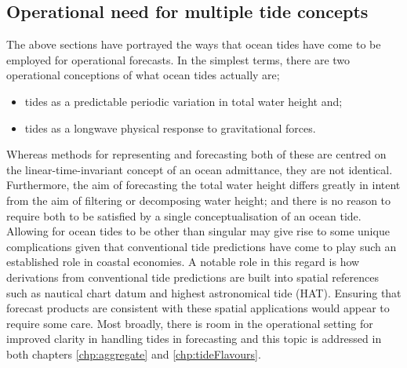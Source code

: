 \subsection{Operational need for multiple tide concepts}
The above sections have portrayed the ways that ocean tides have come to be employed for operational forecasts.
In the simplest terms, there are two operational conceptions of what ocean tides actually are;
\begin{itemize}
    \item tides as a predictable periodic variation in total water height and;
    \item tides as a longwave physical response to gravitational forces.
\end{itemize}
Whereas methods for representing and forecasting both of these are centred on the linear-time-invariant concept of an ocean admittance, they are not identical.
Furthermore, the aim of forecasting the total water height differs greatly in intent from the aim of filtering or decomposing water height; and there is no reason to require both to be satisfied by a single conceptualisation of an ocean tide. 
Allowing for ocean tides to be other than singular may give rise to some unique complications given that conventional tide predictions have come to play such an established role in coastal economies.   A notable role in this regard is how derivations from conventional tide predictions are built into spatial references such as nautical chart datum and highest astronomical tide (HAT).   Ensuring that forecast products are consistent with these spatial applications would appear to require some care.  
Most broadly, there is room in the operational setting for improved clarity in handling tides in forecasting and this topic is addressed in both chapters 
\ref{chp:aggregate} and \ref{chp:tideFlavours}. 
